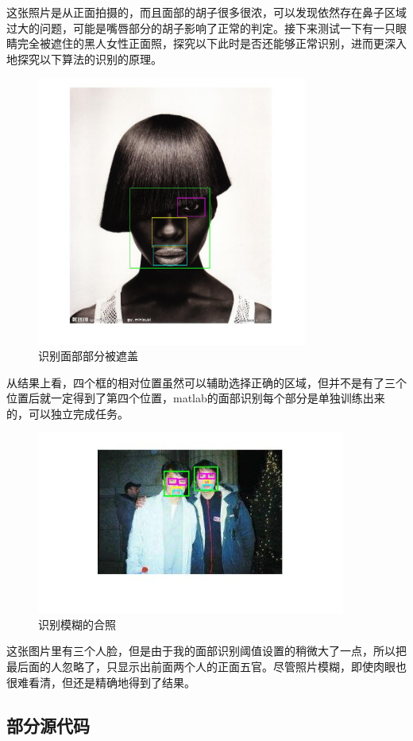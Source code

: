 \documentclass[a4paper, 14pt, twocolumn]{article}
\theoremstyle{definition}
\begin{document}
这张照片是从正面拍摄的，而且面部的胡子很多很浓，可以发现依然存在鼻子区域过大的问题，可能是嘴唇部分的胡子影响了正常的判定。接下来测试一下有一只眼睛完全被遮住的黑人女性正面照，探究以下此时是否还能够正常识别，进而更深入地探究以下算法的识别的原理。
\begin{figure}[H]
\includegraphics[width=3.5in]{DetectFaceParts/figure/recog5.jpg}
\caption{识别面部部分被遮盖}
\end{figure}
从结果上看，四个框的相对位置虽然可以辅助选择正确的区域，但并不是有了三个位置后就一定得到了第四个位置，matlab的面部识别每个部分是单独训练出来的，可以独立完成任务。
\begin{figure}[H]
\includegraphics[width=4in]{DetectFaceParts/figure/recog6.jpg}
\caption{识别模糊的合照}
\end{figure}
这张图片里有三个人脸，但是由于我的面部识别阈值设置的稍微大了一点，所以把最后面的人忽略了，只显示出前面两个人的正面五官。尽管照片模糊，即使肉眼也很难看清，但还是精确地得到了结果。


\subsection{部分源代码}
\end{document}
